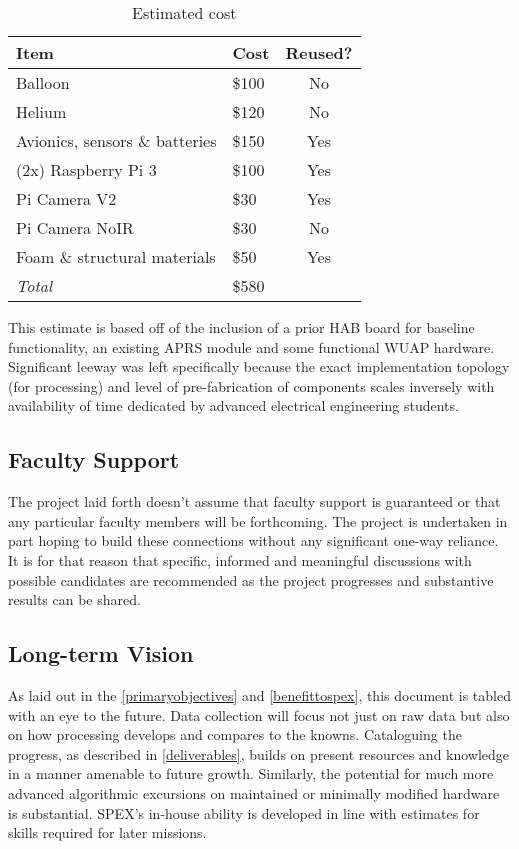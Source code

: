 \documentclass[conference]{IEEEtran} %
\begin{document}
\begin{table}[ht]
  \caption{Estimated cost}
  \centering
  \begin{tabular}{@{}llc@{}}
    \label{budget}
    \textbf{Item} & \textbf{Cost} & \textbf{Reused?} \\
    \midrule
    Balloon & \$100 & No \\
    Helium & \$120 & No\\
    Avionics, sensors \& batteries & \$150 & Yes\\
    (2x) Raspberry Pi 3 & \$100 & Yes\\
    Pi Camera V2 & \$30 & Yes \\
    Pi Camera NoIR & \$30 & No \\
    Foam \& structural materials & \$50 & Yes \\
    \midrule
    \textit{Total} & \$580 & \\
  \end{tabular}
\end{table} 

This estimate is based off of the inclusion of a prior HAB board for baseline functionality, an existing APRS module and some functional WUAP hardware. 
Significant leeway was left specifically because the exact implementation topology (for processing) and level of pre-fabrication of components scales inversely with availability of time dedicated by advanced electrical engineering students.

\subsection{Faculty Support}
The project laid forth doesn't assume that faculty support is guaranteed or that any particular faculty members will be forthcoming. 
The project is undertaken in part hoping to build these connections without any significant one-way reliance. 
It is for that reason that specific, informed and meaningful discussions with possible candidates are recommended as the project progresses and substantive results can be shared.

\subsection{Long-term Vision}
As laid out in the \autoref{primaryobjectives} and \autoref{benefittospex}, this document is tabled with an eye to the future. Data collection will focus not just on raw data but also on how processing develops and compares to the knowns. 
Cataloguing the progress, as described in \autoref{deliverables}, builds on present resources and knowledge in a manner amenable to future growth. 
Similarly, the potential for much more advanced algorithmic excursions on maintained or minimally modified hardware is substantial. 
SPEX's in-house ability is developed in line with estimates for skills required for later missions. 
\end{document}
